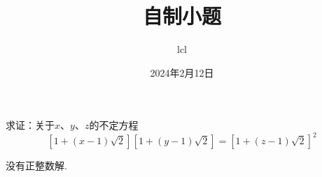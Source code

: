 \documentclass[11pt]{article}
\title{自制小题}
\date{2024年2月12日}
\author{lcl}
\begin{document}
\maketitle
求证：关于$x$、$y$、$z$的不定方程$$[1+(x-1)\sqrt{2}][1+(y-1)\sqrt{2}]=[1+(z-1)\sqrt{2}]^2$$ \par
没有正整数解.
\end{document}
